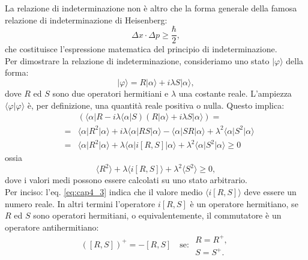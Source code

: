 La relazione di indeterminazione non è altro che la forma generale della famosa relazione di indeterminazione di Heisenberg:
\begin{equation}
\Delta x \cdot \Delta p \geq \frac{\hbar}{2},
\end{equation}
che costituisce l'espressione matematica del principio di indeterminazione.\\
Per dimostrare la relazione di indeterminazione, consideriamo uno stato $\vert \varphi \rangle$ della forma:
\begin{equation}
\vert \varphi \rangle = R\vert \alpha \rangle +i \lambda S \vert \alpha \rangle ,
\end{equation}
dove $R$ ed $S$ sono due operatori hermitiani e $\lambda $ una costante reale. L'ampiezza $\langle \varphi \vert \varphi \rangle$ è, per definizione, una quantità reale positiva o nulla. Questo implica:
\begin{eqnarray}
& &\left( \langle \alpha \vert R -i \lambda \langle \alpha \vert S \right) \left( R\vert \alpha \rangle +i \lambda S \vert \alpha \rangle  \right) =\nonumber \\
& = & \langle \alpha \vert R^2 \vert \alpha \rangle + i\lambda \langle \alpha \vert RS \vert \alpha \rangle - \langle \alpha \vert SR \vert \alpha \rangle + \lambda ^2 \langle \alpha \vert S^2 \vert \alpha \rangle\\
& = & \langle \alpha \vert R^2 \vert \alpha \rangle + \lambda \langle \alpha \vert i\left[ R,S\right] \vert \alpha \rangle + \lambda ^2 \langle \alpha \vert S^2 \vert \alpha \rangle \geq 0 \nonumber
\end{eqnarray}
ossia
\begin{equation}
\label{eq:cap4_3}
\langle  R^2  \rangle + \lambda \langle i\left[ R,S \right] \rangle + \lambda ^2 \langle S^2 \rangle \geq 0,
\end{equation}
dove i valori medi possono essere calcolati su uno stato arbitrario.\\
Per inciso: l'eq. \eqref{eq:cap4_3} indica che il valore medio $\langle i\left[ R,S \right] \rangle$ deve essere un numero reale. In altri termini l'operatore $i\left[R,S	\right]$ è un operatore hermitiano, se $R$ ed $S$ sono operatori hermitiani, o equivalentemente, il commutatore è un operatore antihermitiano:
\begin{equation}
\left( \left[R,S \right] \right) ^{+} = - \left[R,S \right] \quad \textrm{se: } \begin{array}{c}
R=R^{+},\\
S=S^{+}.
\end{array}
\end{equation}
